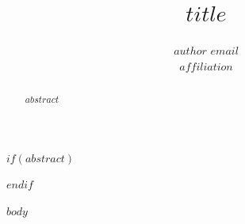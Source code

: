 \documentclass[10pt]{article}
\title{$title$}
\author{\name $author$ \email $email$ \\ \addr $affiliation$}
\begin{document}
\maketitle
$if(abstract)$
\begin{abstract}
$abstract$
\end{abstract}
$endif$

$body$
\end{document}
